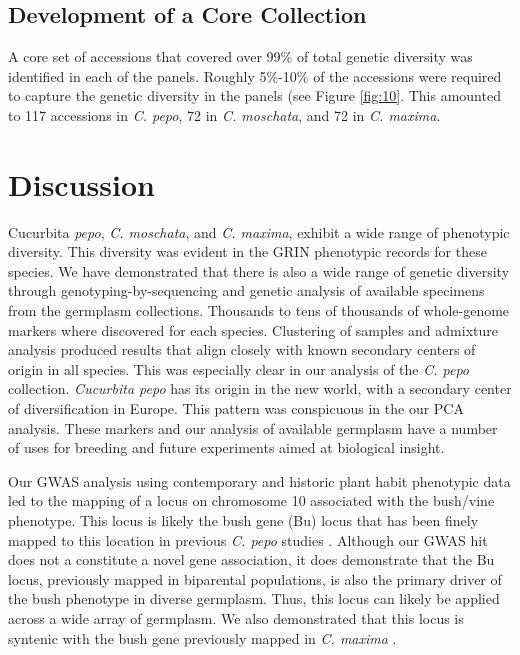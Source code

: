 \documentclass[utf8]{FrontiersinHarvard} %
\begin{document}
\subsection{Development of a Core Collection}
A core set of accessions that covered over 99\% of total genetic diversity was identified in each of the panels. Roughly 5\%-10\% of the accessions were required to capture the genetic diversity in the panels (see Figure \ref{fig:10}. This amounted to 117 accessions in \textit{C. pepo}, 72 in \textit{C. moschata}, and 72 in \textit{C. maxima}.

\section{Discussion}
Cucurbita \textit{pepo}, \textit{C. moschata}, and \textit{C. maxima}, exhibit a wide range of phenotypic diversity. This diversity was evident in the GRIN phenotypic records for these species. We have demonstrated that there is also a wide range of genetic diversity through genotyping-by-sequencing and genetic analysis of available specimens from the germplasm collections. Thousands to tens of thousands of whole-genome markers where discovered for each species. Clustering of samples and admixture analysis produced results that align closely with known secondary centers of origin in all species. This was especially clear in our analysis of the \textit{C. pepo} collection. \textit{Cucurbita pepo} has its origin in the new world, with a secondary center of diversification in Europe. This pattern was conspicuous in the our PCA analysis. These markers and our analysis of available germplasm have a number of uses for breeding and future experiments aimed at biological insight.

Our GWAS analysis using contemporary and historic plant habit phenotypic data led to the mapping of a locus on chromosome 10 associated with the bush/vine phenotype. This locus is likely the bush gene (Bu) locus that has been finely mapped to this location in previous \textit{C. pepo} studies \citep{Xiang2018, Ding2021}. Although our GWAS hit does not a constitute a novel gene association, it does demonstrate that the Bu locus, previously mapped in biparental populations, is also the primary driver of the bush phenotype in diverse germplasm. Thus, this locus can likely be applied across a wide array of germplasm. We also demonstrated that this locus is syntenic with the bush gene previously mapped in \textit{C. maxima} \citep{Zhang2015}. 
\end{document}
